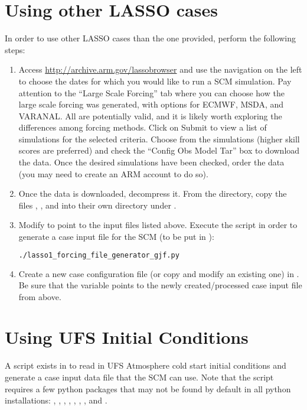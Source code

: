 \section{Using other LASSO cases}
\label{sec:lasso}

In order to use other LASSO cases than the one provided, perform the following steps:
\begin{enumerate}
\item Access \url{http://archive.arm.gov/lassobrowser} and use the navigation on the left to choose the dates for which you would like to run a SCM simulation. Pay attention to the ``Large Scale Forcing'' tab where you can choose how the large scale forcing was generated, with options for ECMWF, MSDA, and VARANAL. All are potentially valid, and it is likely worth exploring the differences among forcing methods. Click on Submit to view a list of simulations for the selected criteria. Choose from the simulations (higher skill scores are preferred) and check the ``Config Obs Model Tar'' box to download the data. Once the desired simulations have been checked, order the data (you may need to create an ARM account to do so).
\item Once the data is downloaded, decompress it. From the  directory, copy the files , , and  into their own directory under .
\item Modify  to point to the input files listed above. Execute the script in order to generate a case input file for the SCM (to be put in ):
\begin{lstlisting}[language=bash]
./lasso1_forcing_file_generator_gjf.py
\end{lstlisting}
\item Create a new case configuration file (or copy and modify an existing one) in . Be sure that the  variable points to the newly created/processed case input file from above.
\end{enumerate}

\section{Using UFS Initial Conditions}
\label{sec:UFS ICs}

A script exists in  to read in UFS Atmosphere cold start initial conditions and generate a case input data file that the SCM can use. Note that the script requires a few python packages that may not be found by default in all python installations: , , , , , , , and . 

